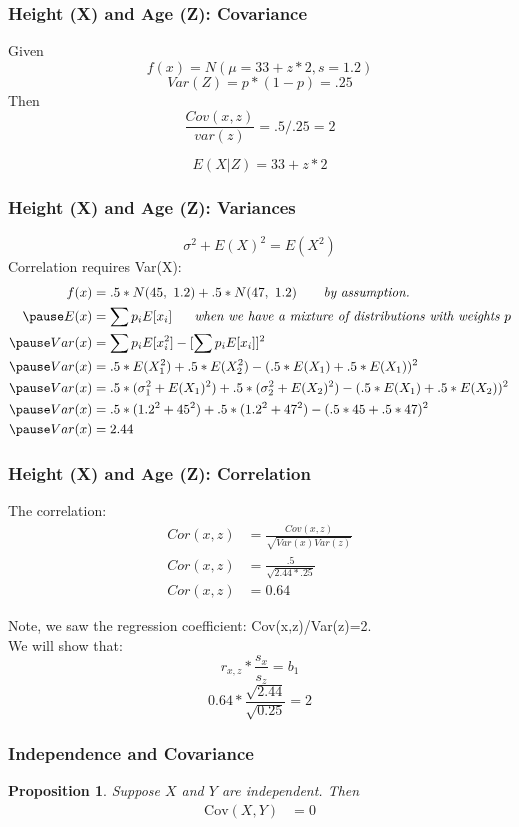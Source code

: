 \documentclass[aspectratio=169, handout]{beamer}
\newtheorem{prop}{Proposition}
\numberwithin{equation}{section}
\begin{document}
\begin{frame}
\frametitle{Height (X) and Age (Z): Covariance}

Given  $$f(x)=N(\mu=33+z*2, s= 1.2)$$
$$Var(Z)=p*(1-p)=.25$$
Then $$\frac{Cov(x,z)}{var(z)}=.5/.25=2$$\pause

$$E(X|Z)=33+z*2$$

\end{frame}


\begin{frame}
\frametitle{Height (X) and Age (Z): Variances}
$$\sigma^2+E(X)^2=E(X^2)$$
Correlation requires Var(X):
\begin{align*}
f(x)&=.5*N(45,\ 1.2)+.5*N(47,\ 1.2)\ \ \quad \textit{ by assumption.}\\\pause
E(x)&=\sum p_i E[x_i] \ \quad \textit{ when we have a mixture of distributions with weights $p$}\\\pause
Var(x)&=\sum p_i E[x_i^2]-[\sum p_i E[x_i]]^2\\\pause
Var(x)&=.5*E(X_1^2)+.5*E(X_2^2)-(.5*E(X_1)+.5*E(X_1))^2\\\pause
Var(x)&=.5*(\sigma_1^2+E(X_1)^2)+.5*(\sigma_2^2+E(X_2)^2)-(.5*E(X_1)+.5*E(X_2))^2\\\pause
Var(x)&=.5*(1.2^2+45^2)+.5*(1.2^2+47^2)-(.5*45+.5*47)^2\\\pause
Var(x)&=2.44
\end{align*}
\end{frame}

\begin{frame}
\frametitle{Height (X) and Age (Z): Correlation}
The correlation:
\begin{align*}
Cor(x,z)&=\frac{Cov(x,z)}{\sqrt{Var(x)Var(z)}}\\
Cor(x,z)&=\frac{.5}{\sqrt{2.44*.25}}\\
Cor(x,z)&=0.64
\end{align*}

Note, we saw the regression coefficient: Cov(x,z)/Var(z)=2. \\
We will show that:
$$r_{x,z}*\frac{s_x}{s_z}=b_1$$
$$0.64*\frac{\sqrt{2.44}}{\sqrt{0.25}}=2$$
\end{frame}


\begin{frame}
\frametitle{Independence and Covariance}

\begin{prop}
Suppose $X$ and $Y$ are independent.  Then 
\begin{align*}
\text{Cov}(X, Y) &= 0  
\end{align*}

\end{prop}

\end{frame}
\end{document}
